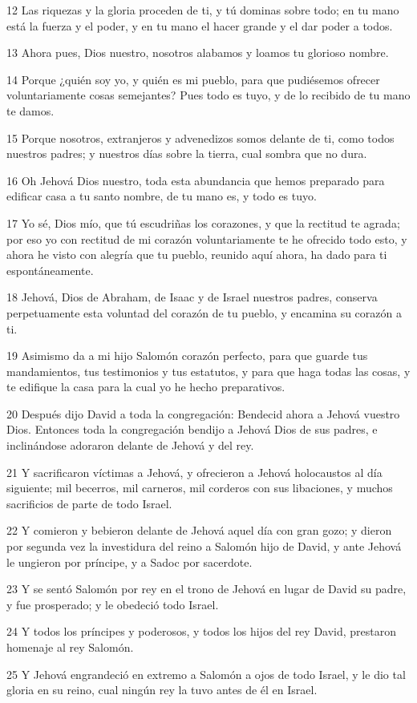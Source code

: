 \par 12 Las riquezas y la gloria proceden de ti, y tú dominas sobre todo; en tu mano está la fuerza y el poder, y en tu mano el hacer grande y el dar poder a todos.
\par 13 Ahora pues, Dios nuestro, nosotros alabamos y loamos tu glorioso nombre.
\par 14 Porque ¿quién soy yo, y quién es mi pueblo, para que pudiésemos ofrecer voluntariamente cosas semejantes? Pues todo es tuyo, y de lo recibido de tu mano te damos.
\par 15 Porque nosotros, extranjeros y advenedizos somos delante de ti, como todos nuestros padres; y nuestros días sobre la tierra, cual sombra que no dura.
\par 16 Oh Jehová Dios nuestro, toda esta abundancia que hemos preparado para edificar casa a tu santo nombre, de tu mano es, y todo es tuyo.
\par 17 Yo sé, Dios mío, que tú escudriñas los corazones, y que la rectitud te agrada; por eso yo con rectitud de mi corazón voluntariamente te he ofrecido todo esto, y ahora he visto con alegría que tu pueblo, reunido aquí ahora, ha dado para ti espontáneamente.
\par 18 Jehová, Dios de Abraham, de Isaac y de Israel nuestros padres, conserva perpetuamente esta voluntad del corazón de tu pueblo, y encamina su corazón a ti.
\par 19 Asimismo da a mi hijo Salomón corazón perfecto, para que guarde tus mandamientos, tus testimonios y tus estatutos, y para que haga todas las cosas, y te edifique la casa para la cual yo he hecho preparativos.
\par 20 Después dijo David a toda la congregación: Bendecid ahora a Jehová vuestro Dios. Entonces toda la congregación bendijo a Jehová Dios de sus padres, e inclinándose adoraron delante de Jehová y del rey.
\par 21 Y sacrificaron víctimas a Jehová, y ofrecieron a Jehová holocaustos al día siguiente; mil becerros, mil carneros, mil corderos con sus libaciones, y muchos sacrificios de parte de todo Israel.
\par 22 Y comieron y bebieron delante de Jehová aquel día con gran gozo; y dieron por segunda vez la investidura del reino a Salomón hijo de David, y ante Jehová le ungieron por príncipe, y a Sadoc por sacerdote.
\par 23 Y se sentó Salomón por rey en el trono de Jehová en lugar de David su padre, y fue prosperado; y le obedeció todo Israel.
\par 24 Y todos los príncipes y poderosos, y todos los hijos del rey David, prestaron homenaje al rey Salomón.
\par 25 Y Jehová engrandeció en extremo a Salomón a ojos de todo Israel, y le dio tal gloria en su reino, cual ningún rey la tuvo antes de él en Israel.

